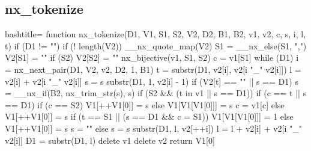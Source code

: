 \newpage
\subsection{nx_tokenize}
\label{nx_tokenize}
\begin{NexCodeBox}{bash}{title={}}
function nx_tokenize(D1, V1, S1, S2, V2, D2, B1, B2, v1, v2, c, s, i, l, t) {
    if (D1 != "") {
        if (! length(V2))
            __nx_quote_map(V2)
        S1 = __nx_else(S1, ",")
        V2[S1] = ""
        if (S2) {
            V2[S2] = ""
            nx_bijective(v1, S1, S2)
            c = v1[S1]
        }
        while (D1) {
            i = nx_next_pair(D1, V2, v2, D2, 1, B1)
            t = substr(D1, v2[i], v2[i "_" v2[i]])
            l = v2[i] + v2[i "_" v2[i]]
            s = s substr(D1, 1, v2[i] - 1)
            if (V2[t] == "" || s == D1) {
                s = __nx_if(B2, nx_trim_str(s), s)
                if (S2 && (t in v1 || s == D1)) {
                    if (c == t || s == D1) {
                        if (c == S2)
                            V1[++V1[0]] = s
                        else
                            V1[V1[V1[0]]] = s
                        c = v1[c]
                    } else {
                        V1[++V1[0]] = s
                        if (t == S1 || (s == D1 && c = S1))
                            V1[V1[V1[0]]] = 1
                    }
                } else {
                    V1[++V1[0]] = s
                }
                s = ""
            } else {
                s = s substr(D1, l, v2[++i])
                l = l + v2[i] + v2[i "_" v2[i]]
            }
            D1 = substr(D1, l)
        }
        delete v1
        delete v2
        return V1[0]
    }
}
\end{NexCodeBox}


